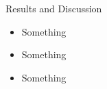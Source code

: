 \begin{frame}{Results and Discussion}
	\begin{itemize}
		\item Something
		\item Something
		\item Something
	\end{itemize}

\end{frame}